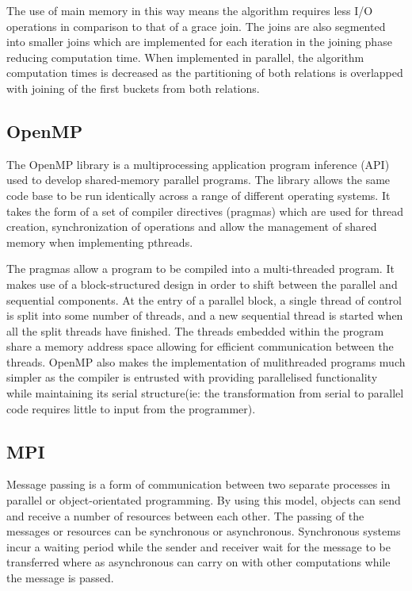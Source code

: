 \documentclass[10pt,twocolumn]{witseiepaper}
\begin{document}
The use of main memory in this way means the algorithm requires less I/O operations in comparison to that of a grace join. The joins are also segmented into smaller joins which are implemented for each iteration in the joining phase reducing computation time. When implemented in parallel, the algorithm computation times is decreased as the partitioning of both relations is overlapped with joining of the first buckets from both relations\cite{evaluating4JoinAlgorithms}.

\subsection{OpenMP}

The OpenMP library is a multiprocessing application program inference (API) used to develop shared-memory parallel programs\cite{comparingMPIMapReduce}. The library allows the same code base to be run identically across a range of different operating systems. It takes the form of a set of compiler directives (pragmas) which are used for thread creation, synchronization of operations and allow the management of shared memory when implementing pthreads. 

The pragmas allow a program to be compiled into a multi-threaded program. It makes use of a block-structured design in order to shift between the parallel and sequential components. At the entry of a parallel block, a single thread of
control is split into some number of threads, and a new sequential thread is started when all the split threads have finished. The threads embedded within the program share a memory address space allowing for efficient communication between the threads. OpenMP also makes the implementation of mulithreaded programs much simpler as the compiler is entrusted with providing parallelised functionality while maintaining its serial structure(ie: the transformation from serial to parallel code requires little to input from the programmer). 


\subsection{MPI}

Message passing is a form of communication between two separate processes in parallel or object-orientated programming. By using this model, objects can send and receive a number of resources between each other\cite{IBM}. The passing of the messages or resources can be synchronous or asynchronous. Synchronous systems incur a waiting period while the sender and receiver wait for the message to be transferred where as asynchronous can carry on with other computations while the message is passed.  
\end{document}
